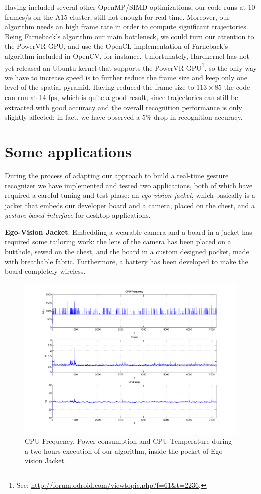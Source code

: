 Having included several other OpenMP/SIMD optimizations, our code runs at 10 frames/s on the A15 cluster, still not enough for real-time. Moreover, our algorithm needs an high frame rate in order to compute significant trajectories. Being Farneback's algorithm our main bottleneck, we could turn our attention to the PowerVR GPU, and use the OpenCL implementation of Farneback's algorithm included in OpenCV, for instance. Unfortunately, Hardkernel has not yet released an Ubuntu kernel that supports the PowerVR GPU\footnote{See: \url{http://forum.odroid.com/viewtopic.php?f=61&t=2236}.}, so the only way we have to increase speed is to further reduce the frame size and keep only one level of the spatial pyramid. Having reduced the frame size to $113\times 85$ the code can run at 14 fps, which is quite a good result, since trajectories can still be extracted with good accuracy and the overall recognition performance is only slightly affected: in fact, we have observed a $5\%$ drop in recognition accuracy.

\section{Some applications}
During the process of adapting our approach to build a real-time gesture recognizer we have implemented and tested two applications, both of which have required a careful tuning and test phase: an \textit{ego-vision jacket}, which basically is a jacket that embeds our developer board and a camera, placed on the chest, and a \textit{gesture-based interface} for desktop applications.

\textbf{Ego-Vision Jacket}: Embedding a wearable camera and a board in a jacket has required some tailoring work: the lens of the camera has been placed on a butthole, sewed on the chest, and the board in a custom designed pocket, made with breathable fabric. Furthermore, a battery has been developed to make the board completely wireless. 

\begin{figure}[t!]
\centering
\includegraphics[width=1.2\linewidth,angle=90]{Figures/consumi.pdf}
\caption{CPU Frequency, Power consumption and CPU Temperature during a two hours execution of our algorithm, inside the pocket of Ego-vision Jacket.}
\label{jacket}
\end{figure}

